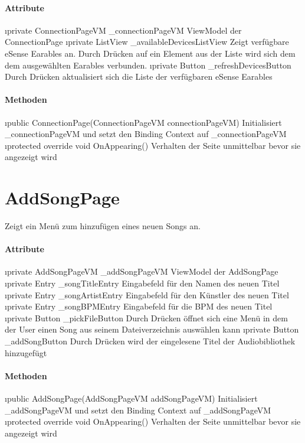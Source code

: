 \documentclass[../entwurf.tex]{subfiles}
\begin{document}
\paragraph{Attribute}
\begin{itemize}
	\i{private ConnectionPageVM \_connectionPageVM} ViewModel der ConnectionPage
	\i{private ListView \_availableDevicesListView} Zeigt verfügbare eSense Earables an. Durch Drücken auf ein Element aus der Liste wird sich dem dem ausgewählten Earables verbunden. 
	\i{private Button \_refreshDevicesButton} Durch Drücken aktualisiert sich die Liste der verfügbaren eSense Earables
\end{itemize}

\paragraph{Methoden}
\begin{itemize}
	\i{public ConnectionPage(ConnectionPageVM connectionPageVM)} Initialisiert \_connectionPageVM und setzt den Binding Context 			auf \_connectionPageVM
	\i{protected override void OnAppearing()} Verhalten der Seite unmittelbar bevor sie angezeigt wird
\end{itemize}

\section{AddSongPage}
Zeigt ein Menü zum hinzufügen eines neuen Songs an.  
\paragraph{Attribute}
\begin{itemize}
	\i{private AddSongPageVM \_addSongPageVM} ViewModel der AddSongPage
	\i{private Entry \_songTitleEntry} Eingabefeld für den Namen des neuen Titel
	\i{private Entry \_songArtistEntry} Eingabefeld für den Künstler des neuen Titel
	\i{private Entry \_songBPMEntry} Eingabefeld für die BPM des neuen Titel
	\i{private Button \_pickFileButton} Durch Drücken öffnet sich eine Menü in dem der User einen Song aus seinem Dateiverzeichnis auswählen kann
	\i{private Button \_addSongButton} Durch Drücken wird der eingelesene Titel der Audiobibliothek hinzugefügt
\end{itemize}

\paragraph{Methoden}
\begin{itemize}
	\i{public AddSongPage(AddSongPageVM addSongPageVM)} Initialisiert \_addSongPageVM und setzt den Binding Context 			auf \_addSongPageVM
	\i{protected override void OnAppearing()} Verhalten der Seite unmittelbar bevor sie angezeigt wird
\end{itemize}
\end{document}
